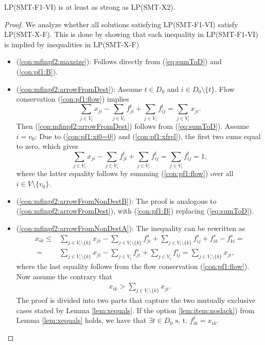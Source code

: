 \begin{prop}
\label{prop:f1strx2}
LP(SMT-F1-VI) is at least as strong as LP(SMT-X2). 
\end{prop}
\begin{proof}
We analyze whether all solutions satisfying LP(SMT-F1-VI) satisfy LP(SMT-X-F). This is done by showing that each inequality in LP(SMT-F1-VI) is implied by inequalities in LP(SMT-X-F) 

\begin{itemize}
\item[] (\ref{con:mfinpf2:maxsize}): Follows directly from (\ref{eq:sumToD}) and (\ref{con:pf1:B}).
\item[] (\ref{con:mfinpf2:arrowFromDest}): Assume $t\in D_0$ and $i\in D_0\setminus\{t\}$. Flow conservation (\ref{con:pf1:flow}) implies
$$\sum_{j\in V_i}x_{ji} - \sum_{j\in V_i}f_{ji}^t + \sum_{j\in V_i}f_{ij}^t = \sum_{j\in V_i}x_{ji}.$$ Then (\ref{con:mfinpf2:arrowFromDest}) follows from (\ref{eq:sumToD}).
Assume $i=v_0$: Due to (\ref{con:pf1:xi0=0}) and (\ref{con:pf1:xfrel}), the first two sums equal to zero, which gives
$$\sum_{j\in V_i}x_{ji} - \sum_{j\in V_i}f_{ji}^t + \sum_{j\in V_i}f_{ij}^t = \sum_{j\in V_i}f_{ij}^t = 1,$$
where the latter equality follows by summing (\ref{con:pf1:flow}) over all $i\in V\setminus\{v_0\}$.
\item[] (\ref{con:mfinpf2:arrowFromNonDestB}): The proof is analogous to (\ref{con:mfinpf2:arrowFromDest}), with (\ref{con:pf1:B}) replacing (\ref{eq:sumToD}).
\item[] (\ref{con:mfinpf2:arrowFromNonDestA}): The inequality can be rewritten as
\begin{align*}
 x_{ik}  \leq& \sum\limits_{j \in V_i\setminus\{k\}}x_{ji}-\sum\limits_{j \in V_i\setminus\{k\}}f^s_{ji}+\sum\limits_{j \in V_i\setminus\{k\}}f^s_{ij} +f^s_{ik}-f^s_{ki} = \\
 ~=& \sum\limits_{j \in V_i\setminus\{k\}}x_{ji}-\sum\limits_{j \in V_i}f^s_{ji}+\sum\limits_{j \in V_i}f^s_{ij} = \sum\limits_{j \in V_i\setminus\{k\}}x_{ji},
\end{align*}
where the last equality follows from the flow conservation (\ref{con:pf1:flow}). Now assume the contrary that
\begin{align}
x_{ik} > \sum\limits_{j \in V_i\setminus\{k\}}x_{ji}.\label{eq:assumContr}\tag{B}
\end{align}
The proof is divided into two parts that capture the two mutually exclusive cases stated by Lemma \ref{lem:xequals}. If the option \ref{lem:item:noslack}) from Lemma \ref{lem:xequals} holds, we have that $\exists t\in D_0 \text{ s. t. }f^t_{ik}=x_{ik}$.


\end{itemize}
\end{proof}
